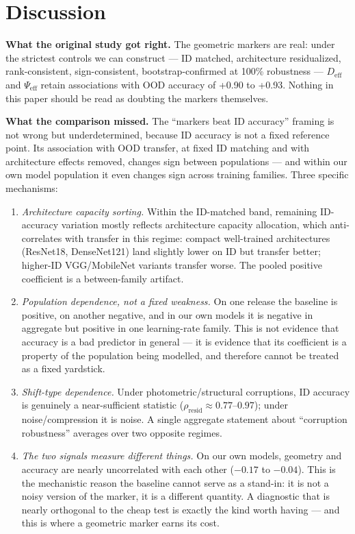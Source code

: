 \documentclass[10pt]{article} %
\begin{document}
\section{Discussion}
\label{sec:discussion}

\textbf{What the original study got right.} The geometric markers are real: under the strictest controls we can construct --- ID matched, architecture residualized, rank-consistent, sign-consistent, bootstrap-confirmed at 100\% robustness --- $D_{\mathrm{eff}}$ and $\Psi_{\mathrm{eff}}$ retain associations with OOD accuracy of +0.90 to +0.93. Nothing in this paper should be read as doubting the markers themselves.

\textbf{What the comparison missed.} The ``markers beat ID accuracy'' framing is not wrong but underdetermined, because ID accuracy is not a fixed reference point. Its association with OOD transfer, at fixed ID matching and with architecture effects removed, changes sign between populations --- and within our own model population it even changes sign across training families. Three specific mechanisms:

\begin{enumerate}
\item \emph{Architecture capacity sorting.} Within the ID-matched band, remaining ID-accuracy variation mostly reflects architecture capacity allocation, which anti-correlates with transfer in this regime: compact well-trained architectures (ResNet18, DenseNet121) land slightly lower on ID but transfer better; higher-ID VGG/MobileNet variants transfer worse. The pooled positive coefficient is a between-family artifact.
\item \emph{Population dependence, not a fixed weakness.} On one release the baseline is positive, on another negative, and in our own models it is negative in aggregate but positive in one learning-rate family. This is not evidence that accuracy is a bad predictor in general --- it is evidence that its coefficient is a property of the population being modelled, and therefore cannot be treated as a fixed yardstick.
\item \emph{Shift-type dependence.} Under photometric/structural corruptions, ID accuracy is genuinely a near-sufficient statistic ($\rho_{\text{resid}}\approx0.77$--$0.97$); under noise/compression it is noise. A single aggregate statement about ``corruption robustness'' averages over two opposite regimes.
\item \emph{The two signals measure different things.} On our own models, geometry and accuracy are nearly uncorrelated with each other ($-0.17$ to $-0.04$). This is the mechanistic reason the baseline cannot serve as a stand-in: it is not a noisy version of the marker, it is a different quantity. A diagnostic that is nearly orthogonal to the cheap test is exactly the kind worth having --- and this is where a geometric marker earns its cost.
\end{enumerate}
\end{document}
